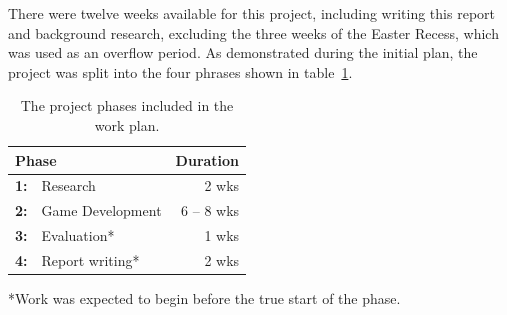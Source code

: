 %

There were twelve weeks available for this project, including writing this report and background research, excluding the three weeks of the Easter Recess, which was used as an overflow period. As demonstrated during the initial plan, the project was split into the four phrases shown in table~\ref{tab:phases}.


\begin{table}[h]
    \centering
    \begin{tabular}{llr}
        \toprule
        \multicolumn{2}{l}{\textbf{Phase}} & Duration\\
        \midrule
        \textbf{1:} & Research  & 2 wks\\
        \textbf{2:} & Game Development  & 6 -- 8 wks\\
        \textbf{3:} & Evaluation*  & 1 wks\\
        \textbf{4:} & Report writing* & 2 wks
        \\ \bottomrule
    \end{tabular}
    \newline
    \vspace*{0.75\baselineskip}
    *Work was expected to begin before the true start of the phase.
    \newline
    \caption{The project phases included in the work plan.}
    \label{tab:phases}
\end{table}

